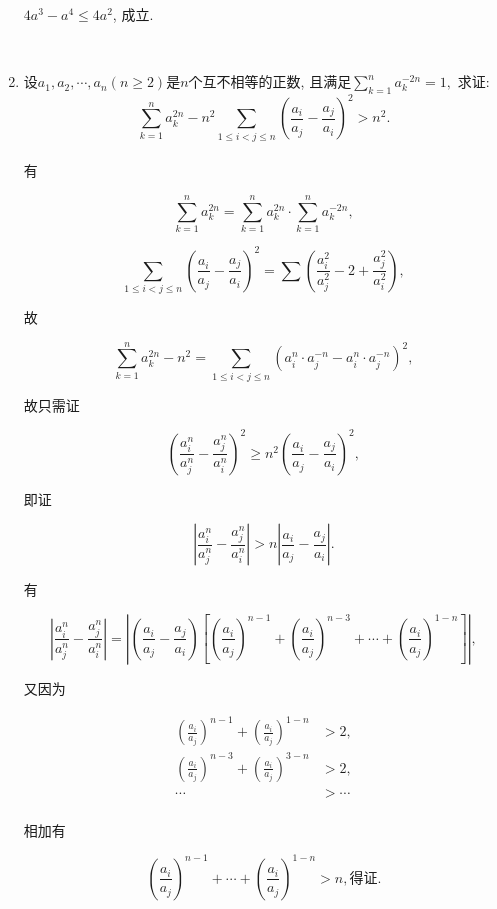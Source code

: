 \documentclass[8pt]{article}
\begin{document}
\begin{enumerate}
			$4a^3 - a^4 \leq 4a^2$, 成立.

		~\\

		\item 设$a_1, a_2, \cdots, a_n (n\geq 2)$是$n$个互不相等的正数, 且满足$\displaystyle \sum_{k=1}^{n} a_k^{-2n} = 1,$ 求证: $$\sum_{k=1}^{n} a_k^{2n} - n^2 \sum_{1\leq i<j\leq n}\left(\frac{a_i}{a_j} - \frac{a_j}{a_i}\right)^2 > n^2.$$
			~\\

			有

			$$\sum_{k=1}^{n} a_k^{2n}=\sum_{k=1}^{n} a_k^{2n} \cdot \sum_{k=1}^{n} a_k^{-2n},$$

			$$\sum_{1\leq i<j \leq n}\left(\frac{a_i}{a_j} - \frac{a_j}{a_i}\right)^2 = \sum\left(\frac{a_i^2}{a_j^2}-2+\frac{a_j^2}{a_i^2}\right),$$

			故

			$$\sum_{k=1}^{n} a_k^{2n} - n^2 = \sum_{1\leq i<j\leq n}\left(a_i^n \cdot a_j^{-n} - a_i^n \cdot a_j^{-n}\right)^2,$$

			故只需证

			$$\left(\frac{a_i^n}{a_j^n} - \frac{a_j^n}{a_i^n}\right)^2 \geq n^2 \left(\frac{a_i}{a_j} - \frac{a_j}{a_i}\right)^2,$$

			即证

			$$\left\vert \frac{a_i^n}{a_j^n} - \frac{a_j^n}{a_i^n} \right\vert > n\left\vert \frac{a_i}{a_j} - \frac{a_j}{a_i} \right\vert.$$

			有

			$$\left\vert \frac{a_i^n}{a_j^n} - \frac{a_j^n}{a_i^n} \right\vert = \left\vert \left(\frac{a_i}{a_j} - \frac{a_j}{a_i}\right) \left[\left(\frac{a_i}{a_j}\right)^{n-1} + \left(\frac{a_i}{a_j}\right)^{n-3} + \cdots + \left(\frac{a_i}{a_j}\right)^{1-n}\right]\right\vert,$$

			又因为

			\begin{align*}
				\left(\frac{a_i}{a_j}\right)^{n-1} + \left(\frac{a_i}{a_j}\right)^{1-n} &> 2,\\
				\left(\frac{a_i}{a_j}\right)^{n-3} + \left(\frac{a_i}{a_j}\right)^{3-n} &> 2,\\
				\cdots &> \cdots \\
			\end{align*}

			相加有

			$$\left(\frac{a_i}{a_j}\right)^{n-1} + \cdots + \left(\frac{a_i}{a_j}\right)^{1-n} > n, \text{得证.}$$


\end{enumerate}
\end{document}
